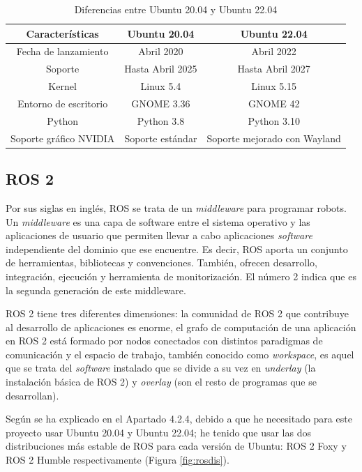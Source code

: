 \begin{table}[H]
	\begin{center}
		\begin{tabular}{|c|c|c|}
			\hline
			\textbf{Características} & \textbf{Ubuntu 20.04} & \textbf{Ubuntu 22.04} \\
			\hline
			 Fecha de lanzamiento & Abril 2020 & Abril 2022\\
			 Soporte & Hasta Abril 2025 & Hasta Abril 2027\\
			 Kernel & Linux 5.4 & Linux 5.15 \\
			 Entorno de escritorio & GNOME 3.36 & GNOME 42\\
			 Python & Python 3.8 & Python 3.10\\
			 Soporte gráfico NVIDIA & Soporte estándar & Soporte mejorado con Wayland\\
			\hline
		\end{tabular}
		\caption{Diferencias entre Ubuntu 20.04 y Ubuntu 22.04}
		\label{cuadro:ubuntu}
	\end{center}
\end{table}


\subsection{ROS 2}

Por sus siglas en inglés, \ac{ROS} se trata de un \textit{middleware} para programar robots. Un \textit{middleware} es una capa de software entre el sistema operativo y las aplicaciones de usuario que permiten llevar a cabo aplicaciones \textit{software} independiente del dominio que ese encuentre. Es decir, \acs{ROS} aporta un conjunto de herramientas, bibliotecas y convenciones. También, ofrecen desarrollo, integración, ejecución y herramienta de monitorización. El número 2 indica que es la segunda generación de este middleware. 

\acs{ROS} 2 tiene tres diferentes dimensiones: la comunidad de \acs{ROS} 2 que contribuye al desarrollo de aplicaciones es enorme, el grafo de computación de una aplicación en \acs{ROS} 2 está formado por nodos conectados con distintos paradigmas de comunicación y el espacio de trabajo, también conocido como \textit{workspace}, es aquel que se trata del \textit{software} instalado que se divide a su vez en \textit{underlay} (la instalación básica de \acs{ROS} 2) y \textit{overlay} (son el resto de programas que se desarrollan).

Según se ha explicado en el Apartado 4.2.4, debido a que he necesitado para este proyecto usar Ubuntu 20.04 y Ubuntu 22.04; he tenido que usar las dos distribuciones más estable de \acs{ROS} para cada versión de Ubuntu: \acs{ROS} 2 Foxy y \acs{ROS} 2 Humble respectivamente (Figura \ref{fig:rosdis}).


